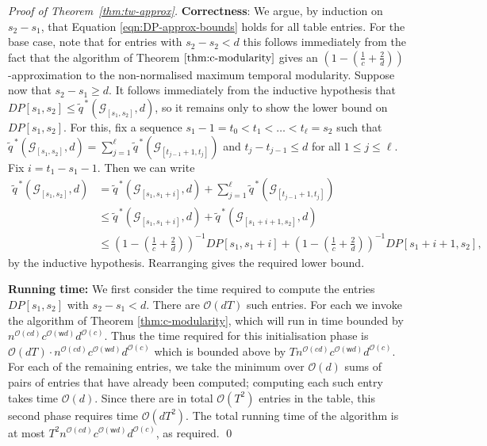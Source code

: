 \documentclass[runningheads]{llncs}
\newcommand{\cG}{\mathcal{G}}
\newcommand{\w}{\mathsf{w}}
\begin{document}
\begin{proof}[Proof of Theorem~\ref{thm:tw-approx}]
    \noindent
    \textbf{Correctness}: We argue, by induction on $s_2 - s_1$, that Equation \eqref{eqn:DP-approx-bounds} holds for all table entries.  For the base case, note that for entries with $s_2 - s_2 < d$ this follows immediately from the fact that the algorithm of Theorem $\ref{thm:c-modularity}$ gives an $ \left(1-(\frac{1}{c}+\frac{2}{d})\right)$-approximation to the non-normalised maximum temporal modularity.  Suppose now that $s_2 - s_1 \geq d$.  It follows immediately from the inductive hypothesis that $DP[s_1,s_2] \leq \widetilde{q}^{\,*}(\cG_{[s_1,s_2]},d)$, so it remains only to show the lower bound on $DP[s_1,s_2]$.  For this, fix a sequence $s_1-1=t_0 < t_1 < \dots < t_\ell = s_2$ such that $\widetilde{q}^{\,*}(\cG_{[s_1,s_2]},d) = \sum_{j=1}^\ell \widetilde{q}^{\,*}(\cG_{[t_{j-1}+1,t_j]})$ and $t_j - t_{j-1} \leq d$ for all $1 \leq j \leq \ell$.  Fix $i = t_1 - s_1 - 1$.  Then we can write 
    \begin{align*}
        \widetilde{q}^{\,*}(\cG_{[s_1,s_2]},d) &= \widetilde{q}^{\,*}(\cG_{[s_1,s_1+i]},d) + \sum_{j=1}^\ell \widetilde{q}^{\,*}(\cG_{[t_{j-1}+1,t_j]}) \\
        & \leq \widetilde{q}^{\,*}(\cG_{[s_1,s_1+i]},d) + \widetilde{q}^{\,*}(\cG_{[s_1+i+1,s_2]},d) \\
        & \leq \left(1-(\frac{1}{c}+\frac{2}{d})\right)^{-1} DP[s_1,s_1+i] + \left(1-(\frac{1}{c}+\frac{2}{d})\right)^{-1}DP[s_1+i+1,s_2],
    \end{align*}
    by the inductive hypothesis.  Rearranging gives the required lower bound.

    \vspace{6pt}
    \noindent
    \textbf{Running time:} We first consider the time required to compute the entries $DP[s_1,s_2]$ with $s_2-s_1<d$.  There are $\mathcal{O}(dT)$ such entries. For each we invoke the algorithm of Theorem \ref{thm:c-modularity}, which will run in time bounded by $n^{\mathcal{O}(cd)}c^{\mathcal{O}(\w d)}d^{\mathcal{O}(c)}$. Thus the time required for this initialisation phase is $\mathcal{O}(dT)\cdot n^{\mathcal{O}(cd)}c^{\mathcal{O}(\w d)}d^{\mathcal{O}(c)}$ which is bounded above by $Tn^{\mathcal{O}(cd)}c^{\mathcal{O}(\w d)}d^{\mathcal{O}(c)}$.  For each of the remaining entries, we take the minimum over $\mathcal{O}(d)$ sums of pairs of entries that have already been computed; computing each such entry takes time $\mathcal{O}(d)$.  Since there are in total $\mathcal{O}(T^2)$ entries in the table, this second phase requires time $\mathcal{O}(dT^2)$.  The total running time of the algorithm is at most $T^2n^{\mathcal{O}(cd)}c^{\mathcal{O}(\w d)}d^{\mathcal{O}(c)}$, as required.
    \qed
\end{proof}
\end{document}
